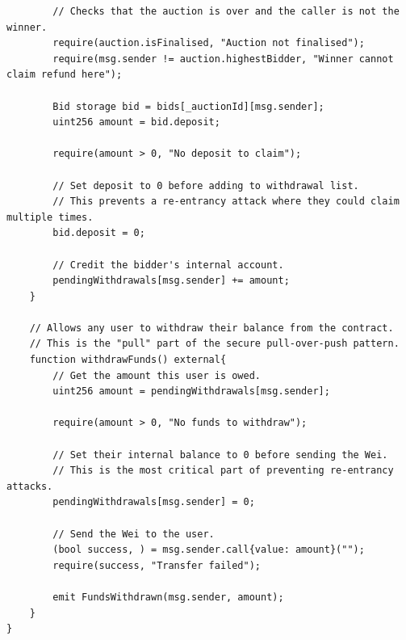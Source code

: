 \documentclass[11pt, a4paper]{article}
\begin{document}
\begin{lstlisting}
        // Checks that the auction is over and the caller is not the winner.
        require(auction.isFinalised, "Auction not finalised");
        require(msg.sender != auction.highestBidder, "Winner cannot claim refund here");

        Bid storage bid = bids[_auctionId][msg.sender];
        uint256 amount = bid.deposit;

        require(amount > 0, "No deposit to claim");

        // Set deposit to 0 before adding to withdrawal list.
        // This prevents a re-entrancy attack where they could claim multiple times.
        bid.deposit = 0;

        // Credit the bidder's internal account.
        pendingWithdrawals[msg.sender] += amount;
    }

    // Allows any user to withdraw their balance from the contract.
    // This is the "pull" part of the secure pull-over-push pattern.
    function withdrawFunds() external{
        // Get the amount this user is owed.
        uint256 amount = pendingWithdrawals[msg.sender];

        require(amount > 0, "No funds to withdraw");

        // Set their internal balance to 0 before sending the Wei.
        // This is the most critical part of preventing re-entrancy attacks.
        pendingWithdrawals[msg.sender] = 0;

        // Send the Wei to the user.
        (bool success, ) = msg.sender.call{value: amount}("");
        require(success, "Transfer failed");

        emit FundsWithdrawn(msg.sender, amount);
    }
}
\end{lstlisting}


\end{document}

